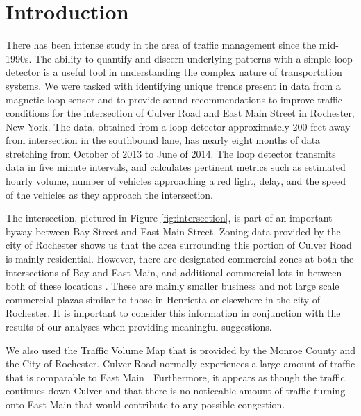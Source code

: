 \documentclass{report}
\begin{document}



\noindent
\section*{Introduction}


There has been intense study in the area of traffic management since the mid-1990s. The ability to quantify and discern underlying patterns with a simple loop detector is a useful tool in understanding the complex nature of transportation systems. We were tasked with identifying unique trends present in data from a magnetic loop sensor and to provide sound recommendations to improve traffic conditions for the intersection of Culver Road and East Main Street in Rochester, New York. The data, obtained from a loop detector approximately 200 feet away from intersection in the southbound lane, has nearly eight months of data stretching from October of 2013 to June of 2014. The loop detector transmits data in five minute intervals, and calculates pertinent metrics such as estimated hourly volume, number of vehicles approaching a red light, delay, and the speed of the vehicles as they approach the intersection.

The intersection, pictured in Figure \ref{fig:intersection}, is part of an important byway between Bay Street and East Main Street. Zoning data provided by the city of Rochester shows us that the area surrounding this portion of Culver Road is mainly residential. However, there are designated commercial zones at both the intersections of Bay and East Main, and additional commercial lots in between both of these locations \cite{PropInfo}. These are mainly smaller business and not large scale commercial plazas similar to those in Henrietta or elsewhere in the city of Rochester. It is important to consider this information in conjunction with the results of our analyses when providing meaningful suggestions.

We also used the Traffic Volume Map that is provided by the Monroe County and the City of Rochester. Culver Road normally experiences a large amount of traffic that is comparable to East Main \cite{TrafficMap}. Furthermore, it appears as though the traffic continues down Culver and that there is no noticeable amount of traffic turning onto East Main that would contribute to any possible congestion.
\end{document}

